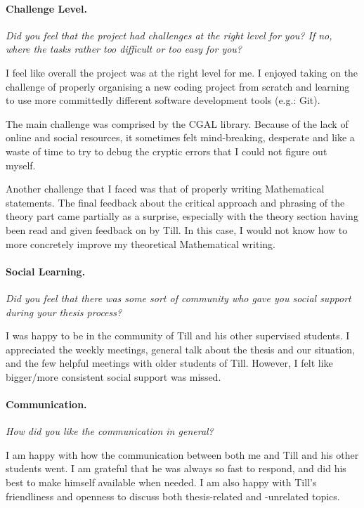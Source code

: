 \documentclass{article}
\begin{document}
\paragraph{Challenge Level.}
\textit{Did you feel that the project had challenges at the right level for you?
If no, where the tasks rather too difficult or too easy for you?}

I feel like overall the project was at the right level for me. I enjoyed taking on the challenge of properly organising a new coding project from scratch and learning to use more committedly different software development tools (e.g.: Git).

The main challenge was comprised by the CGAL library. Because of the lack of online and social resources, it sometimes felt mind-breaking, desperate and like a waste of time to try to debug the cryptic errors that I could not figure out myself.

Another challenge that I faced was that of properly writing Mathematical statements. The final feedback about the critical approach and phrasing of the theory part came partially as a surprise, especially with the theory section having been read and given feedback on by Till. In this case, I would not know how to more concretely improve my theoretical Mathematical writing.



\paragraph{Social Learning.}
\textit{Did you feel that there was some sort of community who gave you social support during your thesis process?}

I was happy to be in the community of Till and his other supervised students. I appreciated the weekly meetings, general talk about the thesis and our situation, and the few helpful meetings with older students of Till. However, I felt like bigger/more consistent social support was missed.


\paragraph{Communication.}
\textit{How did you like the communication in general?}

I am happy with how the communication between both me and Till and his other students went. I am grateful that he was always so fast to respond, and did his best to make himself available when needed.
I am also happy with Till's friendliness and openness to discuss both thesis-related and -unrelated topics.
\end{document}
